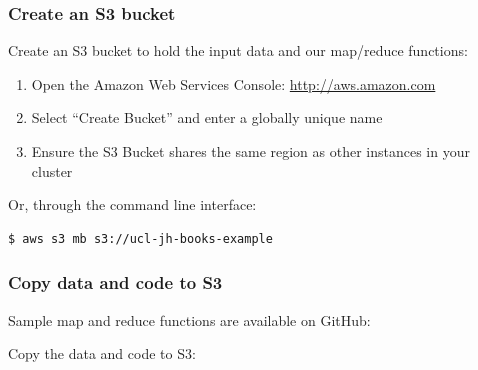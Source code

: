 \subsubsection{Create an S3 bucket}\label{create-an-s3-bucket}

Create an S3 bucket to hold the input data and our map/reduce functions:

\begin{enumerate}
\def\labelenumi{\arabic{enumi}.}
\itemsep1pt\parskip0pt
\item
  Open the Amazon Web Services Console:
  \href{http://aws.amazon.com/}{http://aws.amazon.com}
\item
  Select ``Create Bucket'' and enter a globally unique name
\item
  Ensure the S3 Bucket shares the same region as other instances in your
  cluster
\end{enumerate}

Or, through the command line interface:

\begin{verbatim}
$ aws s3 mb s3://ucl-jh-books-example
\end{verbatim}

\subsubsection{Copy data and code to S3}\label{copy-data-and-code-to-s3}

Sample map and reduce functions are available on GitHub:

\begin{Shaded}
\begin{Highlighting}[]
\NormalTok{$ } 
\end{Highlighting}
\end{Shaded}

Copy the data and code to S3:

\begin{Shaded}
\begin{Highlighting}[]
\NormalTok{$ } 
\NormalTok{$ } 
\NormalTok{$ } 
\end{Highlighting}
\end{Shaded}

